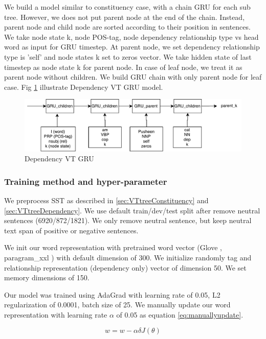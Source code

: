 We build a model similar to constituency case, with a chain GRU for each sub tree. However, we does not put parent node at the end of the chain. Instead, parent node and child node are sorted according to their position in sentences. We take node state k, node POS-tag, node dependency relationship type vs head word as input for GRU timestep. At parent node, we set dependency relationship type is 'self' and node states k set to zeros vector. We take hidden state of last timestep as node state k for parent node. In case of leaf node, we treat it as parent node without children. We build GRU chain with only parent node for leaf case. Fig \ref{fig:dependencyvtgru} illustrate Dependency VT GRU model.

\begin{figure}[h]
	\centering
	\includegraphics[width=0.5\linewidth]{figure/dependencyvtgru}
	\caption[Dependency VT GRU]{Dependency VT GRU}
	\label{fig:dependencyvtgru}
\end{figure}

\subsubsection{Training method and hyper-parameter}
We preprocess SST as described in \ref{sec:VTtreeConstituency} and \ref{sec:VTtreeDependency}. We use default train/dev/test split after remove neutral sentences (6920/872/1821). We only remove neutral sentence, but keep neutral text span of positive or negative sentences. 

We init our word representation with pretrained word vector (Glove \cite{glove}, paragram\_xxl \cite{wieting2015towards}) with default dimension of 300.  We initialize randomly tag and relationship representation (dependency only) vector of dimension 50. We set memory dimensions of 150.

Our model was trained using AdaGrad \cite{duchi2011adaptive} with learning rate of 0.05, L2 regularization of 0.0001, batch size of 25. We manually update our word representation with learning rate $\alpha$ of 0.05 as equation \ref{eq:manuallyupdate}. 

\begin{equation}
\label{eq:manuallyupdate}
w = w - \alpha\delta J(\theta)
\end{equation}


